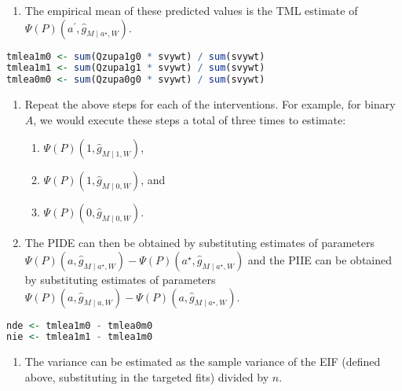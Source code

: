 \documentclass[
  12pt, krantz2,
]{book}
\providecommand{\tightlist}{%
  \setlength{\itemsep}{0pt}\setlength{\parskip}{0pt}}
\theoremstyle{definition}
\theoremstyle{definition}
\theoremstyle{definition}
\newcommand{\1}{\mathbbm{1}}
\begin{document}
\begin{enumerate}
\def\labelenumi{\arabic{enumi}.}
\setcounter{enumi}{9}
\tightlist
\item
  The empirical mean of these predicted values is the TML estimate of
  \(\Psi(P)(a^\prime, \hat{g}_{M \mid a^{\star}, W})\).
\end{enumerate}

\begin{lstlisting}[language=R]
tmlea1m0 <- sum(Qzupa1g0 * svywt) / sum(svywt)
tmlea1m1 <- sum(Qzupa1g1 * svywt) / sum(svywt)
tmlea0m0 <- sum(Qzupa0g0 * svywt) / sum(svywt)
\end{lstlisting}

\begin{enumerate}
\def\labelenumi{\arabic{enumi}.}
\setcounter{enumi}{10}
\tightlist
\item
  Repeat the above steps for each of the interventions. For example, for
  binary \(A\), we would execute these steps a total of three times to
  estimate:

  \begin{enumerate}
  \def\labelenumii{\arabic{enumii}.}
  \tightlist
  \item
    \(\Psi(P)(1,\hat{g}_{M \mid 1, W})\),
  \item
    \(\Psi(P)(1,\hat{g}_{M \mid 0, W})\), and
  \item
    \(\Psi(P)(0,\hat{g}_{M \mid 0, W})\).
  \end{enumerate}
\item
  The PIDE can then be obtained by substituting estimates of parameters
  \(\Psi(P)(a,\hat{g}_{M \mid a^{\star}, W}) - \Psi(P)(a^{\star},\hat{g}_{M \mid a^{\star}, W})\) and the PIIE
  can be obtained by substituting estimates of parameters
  \(\Psi(P)(a,\hat{g}_{M \mid a,W}) - \Psi(P)(a, \hat{g}_{M \mid a^{\star}, W})\).
\end{enumerate}

\begin{lstlisting}[language=R]
nde <- tmlea1m0 - tmlea0m0
nie <- tmlea1m1 - tmlea1m0
\end{lstlisting}

\begin{enumerate}
\def\labelenumi{\arabic{enumi}.}
\setcounter{enumi}{12}
\tightlist
\item
  The variance can be estimated as the sample variance of the EIF (defined
  above, substituting in the targeted fits) divided by \(n\).
\end{enumerate}
\end{document}
